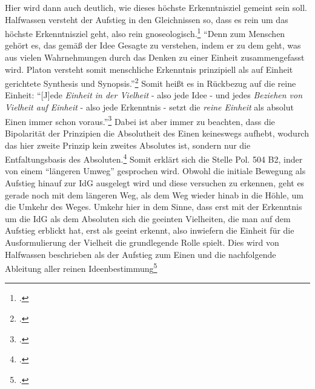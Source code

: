 Hier wird dann auch deutlich, wie dieses höchste Erkenntnisziel gemeint sein soll.\\
Halfwassen versteht der Aufstieg in den Gleichnissen so, dass es rein um das höchste Erkenntnisziel geht, also rein gnoseologisch.\footcite[vgl.][S. 226]{halfwassenaufstieg2006}
\enquote{Denn zum Menschen gehört es, das gemäß der Idee Gesagte zu verstehen, indem er zu dem geht, was aus vielen Wahrnehmungen durch das Denken zu einer Einheit zusammengefasst wird. Platon versteht somit menschliche Erkenntnis prinzipiell als auf Einheit gerichtete Synthesis und Synopsis.}\footcite[][S. 228]{halfwassenaufstieg2006}
Somit heißt es in Rückbezug auf die reine Einheit:
\enquote{[J]ede \emph{Einheit in der Vielheit} - also jede Idee - und jedes \emph{Beziehen von Vielheit auf Einheit} - also jede Erkenntnis - setzt die \emph{reine Einheit} als absolut Einen immer schon voraus.}\footcite[][S. 230]{halfwassenaufstieg2006}
Dabei ist aber immer zu beachten, dass die Bipolarität der Prinzipien die Absolutheit des Einen keineswegs aufhebt, wodurch das hier zweite Prinzip kein zweites Absolutes ist, sondern nur die Entfaltungsbasis des Absoluten.\footcite[vgl.][S. 53]{HalfwassenGeistmetaphysik}
Somit erklärt sich die Stelle Pol. 504 B2, inder von einem \enquote{längeren Umweg} gesprochen wird. Obwohl die initiale Bewegung als Aufstieg hinauf zur IdG ausgelegt wird und diese versuchen zu erkennen, geht es gerade noch mit dem längeren Weg, als dem Weg wieder hinab in die Höhle, um die Umkehr des Weges. Umkehr hier in dem Sinne, dass erst mit der Erkenntnis um die IdG als dem Absoluten sich die geeinten Vielheiten, die man auf dem Aufstieg erblickt hat, erst als geeint erkennt, also inwiefern die Einheit für die Ausformulierung der Vielheit die grundlegende Rolle spielt. Dies wird von Halfwassen beschrieben als der Aufstieg zum Einen und die nachfolgende Ableitung aller reinen Ideenbestimmung\footcite[vgl.][S. 231]{halfwassenaufstieg2006} 

